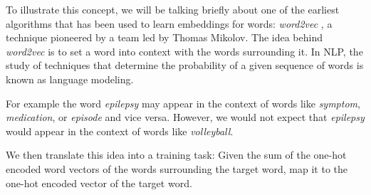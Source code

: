 To illustrate this concept, we will be talking briefly about one of the earliest algorithms that has been used to learn embeddings for words: \textit{word2vec} \cite{mikolov13}, a technique pioneered by a team led by Thomas Mikolov.
The idea behind \textit{word2vec} is to set a word into context with the words surrounding it. In NLP, the study of techniques that determine the probability of a given sequence of words is known as language modeling.

For example the word \textit{epilepsy} may appear in the context of words like \textit{symptom}, \textit{medication}, or \textit{episode} and vice versa.
However, we would not expect that \textit{epilepsy} would appear in the context of words like \textit{volleyball}.

We then translate this idea into a training task:
Given the sum of the one-hot encoded word vectors of the words surrounding the target word, map it to the one-hot encoded vector of the target word.

